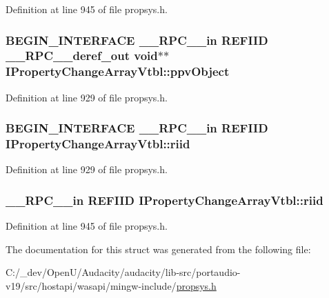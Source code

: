 Definition at line 945 of file propsys.\+h.

\subsubsection[{\texorpdfstring{ppv\+Object}{ppvObject}}]{\setlength{\rightskip}{0pt plus 5cm}B\+E\+G\+I\+N\+\_\+\+I\+N\+T\+E\+R\+F\+A\+CE {\bf \+\_\+\+\_\+\+R\+P\+C\+\_\+\+\_\+in} {\bf R\+E\+F\+I\+ID} {\bf \+\_\+\+\_\+\+R\+P\+C\+\_\+\+\_\+deref\+\_\+out} {\bf void}$\ast$$\ast$ I\+Property\+Change\+Array\+Vtbl\+::ppv\+Object}\hypertarget{struct_i_property_change_array_vtbl_a1532e7faf97734c90901bc59cd67f1ba}{}\label{struct_i_property_change_array_vtbl_a1532e7faf97734c90901bc59cd67f1ba}


Definition at line 929 of file propsys.\+h.

\subsubsection[{\texorpdfstring{riid}{riid}}]{\setlength{\rightskip}{0pt plus 5cm}B\+E\+G\+I\+N\+\_\+\+I\+N\+T\+E\+R\+F\+A\+CE {\bf \+\_\+\+\_\+\+R\+P\+C\+\_\+\+\_\+in} {\bf R\+E\+F\+I\+ID} I\+Property\+Change\+Array\+Vtbl\+::riid}\hypertarget{struct_i_property_change_array_vtbl_afcb4782fa8fc212fa033864bbd143092}{}\label{struct_i_property_change_array_vtbl_afcb4782fa8fc212fa033864bbd143092}


Definition at line 929 of file propsys.\+h.

\subsubsection[{\texorpdfstring{riid}{riid}}]{ {\bf \+\_\+\+\_\+\+R\+P\+C\+\_\+\+\_\+in} {\bf R\+E\+F\+I\+ID} I\+Property\+Change\+Array\+Vtbl\+::riid}\hypertarget{struct_i_property_change_array_vtbl_a62c9c1b7d42896500a8c050752e8c1a5}{}\label{struct_i_property_change_array_vtbl_a62c9c1b7d42896500a8c050752e8c1a5}


Definition at line 945 of file propsys.\+h.



The documentation for this struct was generated from the following file\+:\begin{DoxyCompactItemize}
\item 
C\+:/\+\_\+dev/\+Open\+U/\+Audacity/audacity/lib-\/src/portaudio-\/v19/src/hostapi/wasapi/mingw-\/include/\hyperlink{propsys_8h}{propsys.\+h}\end{DoxyCompactItemize}

